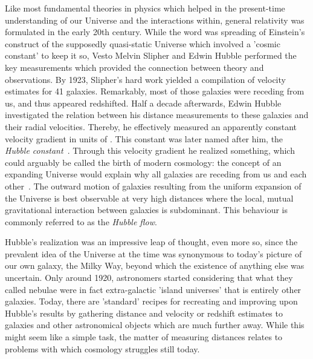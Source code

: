 
Like most fundamental theories in physics which helped in the present-time
understanding of our Universe and the interactions within, general relativity
was formulated in the early 20th century.  While the word was spreading of
Einstein's construct of the supposedly quasi-static Universe which involved a
'cosmic constant' to keep it so, Vesto Melvin Slipher and Edwin Hubble performed
the key measurements which provided the connection between theory and
observations.  By 1923, Slipher's hard work yielded a compilation of velocity
estimates for 41 galaxies.  Remarkably, most of those galaxies were receding
from us, and thus appeared redshifted.  Half a decade afterwards, Edwin Hubble investigated the relation
between his distance measurements to these galaxies and their radial velocities.
Thereby, he effectively measured an apparently constant velocity gradient in
units of \Hunitsalt.  This constant was later named after him, the
\textit{Hubble constant}~\Ho.  Through this velocity gradient he realized
something, which could arguably be called the birth of modern cosmology: the
concept of an expanding Universe would explain why all galaxies are receding
from us and each other~.  The outward motion of galaxies resulting
from the uniform expansion of the Universe is best observable at very high
distances where the local, mutual gravitational interaction between galaxies is
subdominant.  This behaviour is commonly referred to as the \textit{Hubble
flow}.

Hubble's realization was an impressive leap of thought, even more so, since the
prevalent idea of the Universe at the time was synonymous to today's picture of
our own galaxy, the Milky Way, beyond which the existence of anything else was
uncertain.  Only around 1920, astronomers started considering that what they
called nebulae were in fact extra-galactic 'island universes' that is entirely
other galaxies.  Today, there are 'standard' recipes for recreating and
improving upon Hubble's results by
gathering distance and velocity or redshift estimates to galaxies and other
astronomical objects which are much further away.  While this might seem like a
simple task, the matter of measuring distances relates to problems with which
cosmology struggles still today.  

